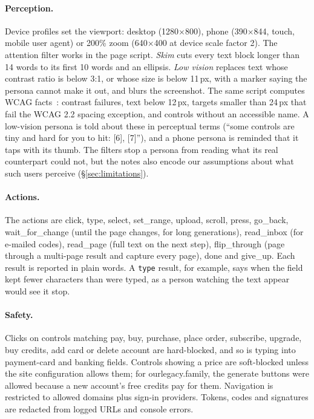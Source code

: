 \documentclass[10pt,twocolumn]{article}
\newcommand{\ol}{\textsf{ourlegacy.family}}
\begin{document}
\paragraph{Perception.} Device profiles set the viewport: desktop (1280$\times$800), phone (390$\times$844, touch, mobile user agent) or 200\% zoom (640$\times$400 at device scale factor 2). The attention filter works in the page script. \emph{Skim} cuts every text block longer than 14 words to its first 10 words and an ellipsis. \emph{Low vision} replaces text whose contrast ratio is below 3:1, or whose size is below 11\,px, with a marker saying the persona cannot make it out, and blurs the screenshot. The same script computes WCAG facts~\cite{w3c2023wcag}: contrast failures, text below 12\,px, targets smaller than 24\,px that fail the WCAG 2.2 spacing exception, and controls without an accessible name. A low-vision persona is told about these in perceptual terms (``some controls are tiny and hard for you to hit: [6], [7]''), and a phone persona is reminded that it taps with its thumb. The filters stop a persona from reading what its real counterpart could not, but the notes also encode our assumptions about what such users perceive (\S\ref{sec:limitations}).

\paragraph{Actions.} The actions are click, type, select, set\_range, upload, scroll, press, go\_back, wait\_for\_change (until the page changes, for long generations), read\_inbox (for e-mailed codes), read\_page (full text on the next step), flip\_through (page through a multi-page result and capture every page), done and give\_up. Each result is reported in plain words. A \texttt{type} result, for example, says when the field kept fewer characters than were typed, as a person watching the text appear would see it stop.

\paragraph{Safety.} Clicks on controls matching pay, buy, purchase, place order, subscribe, upgrade, buy credits, add card or delete account are hard-blocked, and so is typing into payment-card and banking fields. Controls showing a price are soft-blocked unless the site configuration allows them; for \ol{}, the generate buttons were allowed because a new account's free credits pay for them. Navigation is restricted to allowed domains plus sign-in providers. Tokens, codes and signatures are redacted from logged URLs and console errors.
\end{document}
